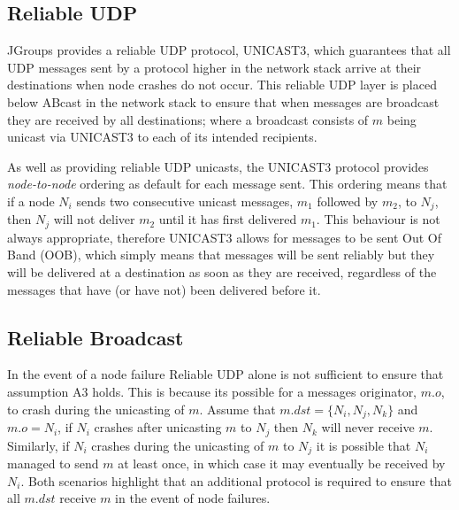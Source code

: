     \subsection{Reliable UDP}\label{ssec:reliable_udp}
    JGroups provides a reliable UDP protocol, \textsf{UNICAST3}, which guarantees that all UDP messages sent by a protocol higher in the network stack arrive at their destinations when node crashes do not occur.  This reliable UDP layer is placed below \textsf{ABcast} in the network stack to ensure that when messages are broadcast they are received by all destinations; where a broadcast consists of $m$ being unicast via \textsf{UNICAST3} to each of its intended recipients.  
    
    As well as providing reliable UDP unicasts, the \textsf{UNICAST3} protocol provides \emph{node-to-node} ordering as default for each message sent.  This ordering means that if a node $N_i$ sends two consecutive unicast messages, $m_1$ followed by $m_2$, to $N_j$, then $N_j$ will not deliver $m_2$ until it has first delivered $m_1$.  This behaviour is not always appropriate, therefore \textsf{UNICAST3} allows for messages to be sent Out Of Band (OOB), which simply means that messages will be sent reliably but they will be delivered at a destination as soon as they are received, regardless of the messages that have (or have not) been delivered before it.  
    
    \subsection{Reliable Broadcast}\label{ssec:rbcast}
    In the event of a node failure Reliable UDP alone is not sufficient to ensure that assumption A3 holds.  This is because its possible for a messages originator, $m.o$, to crash during the unicasting of $m$.  Assume that $m.dst = \{N_i, N_j, N_k\}$ and $m.o = N_i$, if $N_i$ crashes after unicasting $m$ to $N_j$ then $N_k$ will never receive $m$.  Similarly, if $N_i$ crashes during the unicasting of $m$ to $N_j$ it is possible that $N_i$ managed to send $m$ at least once, in which case it may eventually be received by $N_i$.  Both scenarios highlight that an additional protocol is required to ensure that all $m.dst$ receive $m$ in the event of node failures.  
    

